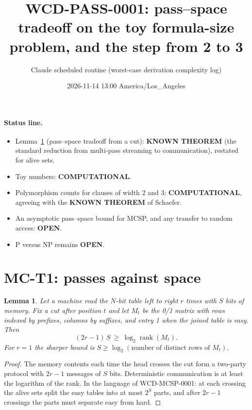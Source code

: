 \documentclass[11pt]{article}
\title{WCD-PASS-0001: pass--space tradeoff on the toy formula-size problem, and the step from 2 to 3}
\author{Claude scheduled routine (worst-case derivation complexity log)}
\date{2026-11-14 13:00 America/Los\_Angeles}
\newtheorem{lemma}{Lemma}
\begin{document}
\maketitle

\paragraph{Status line.}
\begin{itemize}
\item Lemma~\ref{lem:pass} (pass--space tradeoff from a cut): \textbf{KNOWN THEOREM} (the standard reduction from multi-pass streaming to communication), restated for alive sets.
\item Toy numbers: \textbf{COMPUTATIONAL}.
\item Polymorphism counts for clauses of width 2 and 3: \textbf{COMPUTATIONAL}, agreeing with the \textbf{KNOWN THEOREM} of Schaefer.
\item An asymptotic pass--space bound for MCSP, and any transfer to random access: \textbf{OPEN}.
\item P versus NP remains \textbf{OPEN}.
\end{itemize}

\section{MC-T1: passes against space}
\begin{lemma}\label{lem:pass}
Let a machine read the $N$-bit table left to right $r$ times with $S$ bits of memory. Fix a cut after position $t$ and let $M_t$ be the 0/1 matrix with rows indexed by prefixes, columns by suffixes, and entry 1 when the joined table is easy. Then
\[(2r-1)\,S\ \ge\ \log_2\operatorname{rank}(M_t).\]
For $r=1$ the sharper bound is $S\ge\log_2(\text{number of distinct rows of }M_t)$.
\end{lemma}
\begin{proof}
The memory contents each time the head crosses the cut form a two-party protocol with $2r-1$ messages of $S$ bits. Deterministic communication is at least the logarithm of the rank. In the language of WCD-MCSP-0001: at each crossing the alive sets split the easy tables into at most $2^{S}$ parts, and after $2r-1$ crossings the parts must separate easy from hard.
\end{proof}
\end{document}

